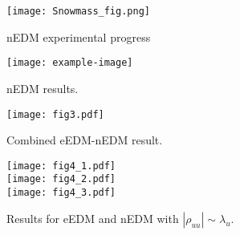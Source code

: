 \begin{figure}[p]
    \centering
    \texttt{[image: Snowmass\_fig.png]}
    \caption{nEDM experimental progress~\cite{Snow22}}
    \label{fig:snowmass}
\end{figure}

\begin{figure}[p]
    \centering
    \begin{minipage}{0.48\textwidth}
      \centering
      \texttt{[image: example-image]}
      \caption{nEDM results.}
      \label{fig:nEDM-fixed}
    \end{minipage}\hfill
    \begin{minipage}{0.48\textwidth}
      \centering
      \texttt{[image: fig3.pdf]}
      \caption{Combined eEDM-nEDM result.}
      \label{fig:nEDM-eEDM}
    \end{minipage}
\end{figure}

\begin{figure}[p]
    \centering
    \texttt{[image: fig4\_1.pdf]}\\
    \texttt{[image: fig4\_2.pdf]}\\
    \texttt{[image: fig4\_3.pdf]}
    \caption{Results for eEDM and nEDM with \(|\rho_{uu}| \sim \lambda_{u}\).}
    \label{fig:nEDM-varied}
\end{figure}